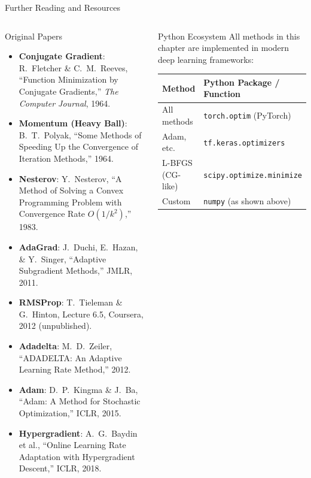 \documentclass[aspectratio=169,10pt]{beamer}
\begin{document}
\begin{frame}[allowframebreaks]{Further Reading and Resources}

  \begin{columns}[T]
      \begin{block}{Original Papers}
        \footnotesize
        \begin{itemize}
          \item \textbf{Conjugate Gradient}: R.~Fletcher \& C.~M.~Reeves,
                ``Function Minimization by Conjugate Gradients,''
                \emph{The Computer Journal}, 1964.
          \item \textbf{Momentum (Heavy Ball)}: B.~T.~Polyak,
                ``Some Methods of Speeding Up the Convergence of
                Iteration Methods,'' 1964.
          \item \textbf{Nesterov}: Y.~Nesterov,
                ``A Method of Solving a Convex Programming Problem
                with Convergence Rate $O(1/k^2)$,'' 1983.
          \item \textbf{AdaGrad}: J.~Duchi, E.~Hazan, \& Y.~Singer,
                ``Adaptive Subgradient Methods,'' JMLR, 2011.
          \item \textbf{RMSProp}: T.~Tieleman \& G.~Hinton,
                Lecture 6.5, Coursera, 2012 (unpublished).
          \item \textbf{Adadelta}: M.~D.~Zeiler,
                ``ADADELTA: An Adaptive Learning Rate Method,'' 2012.
          \item \textbf{Adam}: D.~P.~Kingma \& J.~Ba,
                ``Adam: A Method for Stochastic Optimization,''
                ICLR, 2015.
          \item \textbf{Hypergradient}: A.~G.~Baydin et al.,
                ``Online Learning Rate Adaptation with Hypergradient
                Descent,'' ICLR, 2018.
        \end{itemize}
      \end{block}

      \begin{block}{Python Ecosystem}
        \footnotesize
        All methods in this chapter are implemented in modern
        deep learning frameworks:
        \begin{tabular}{ll}
          \toprule
          Method & Python Package / Function\\
          \midrule
          All methods & \texttt{torch.optim} (PyTorch)\\
          Adam, etc. & \texttt{tf.keras.optimizers}\\
          L-BFGS (CG-like) & \texttt{scipy.optimize.minimize}\\
          Custom & \texttt{numpy} (as shown above)\\
          \bottomrule
        \end{tabular}
      \end{block}


\end{columns}
\end{frame}
\end{document}
